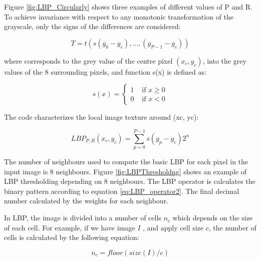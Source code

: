 Figure \ref{fig:LBP_Circularly} shows three examples of different values of P and R.  To achieve invariance with respect to any monotonic transformation of the
grayscale, only the signs of the differences are considered:

\begin{equation}\label{eq:e joint_difference_distribution}
T = t(s(g_0 - g_c) , ... , (g_{P-1} - g_c))
\end{equation}

where  corresponds to the grey value of the centre pixel $(x_c, y_c)$, into the grey values of the 8 surrounding pixels, and function s(x) is defined as:

\begin{equation}\label{eq:LBP_operator2}
s(x) = \left\{ \begin{array}{rl}
 1 &\mbox{ if $x \geq    0$} \\
  0 &\mbox{ if $x < 0$}
       \end{array} \right.
  \end{equation}

The code characterizes the local image texture around (xc, yc):


\begin{equation}\label{eq:LBP_operator3}
LBP_{P,R}(x_c, y_c) =\sum_{p=0}^{P-1}  s(g_p  - g_c)2^n
\end{equation}


 
The number of neighbours used to compute the basic LBP for each pixel in the input image is 8 neighbours. Figure \ref{fig:LBPThresholdng} shows an example of LBP thresholding depending on 8 neighbours. The LBP operator is calculates the binary pattern according to equation \ref{eq:LBP_operator2}. The final decimal number calculated by the weights for each neighbour.

In LBP, the image is divided into a number of cells $n_c$ which depends on the size of each cell. For example, if we have  image $I$ ,  and apply cell size $c$, the number of cells is calculated by the following  equation:

\begin{equation}\label{eq:NoOfLBPCells}
n_c = floor(size(I)/c)
  \end{equation}



